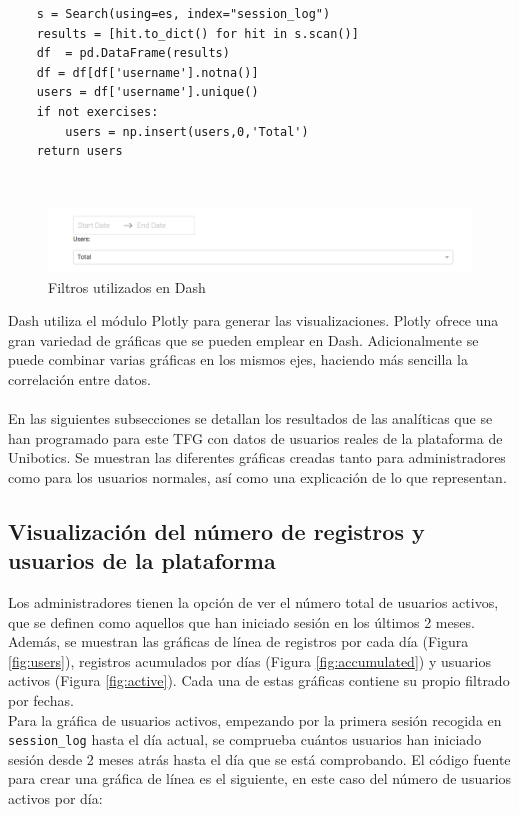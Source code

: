 \begin{lstlisting}
	s = Search(using=es, index="session_log")
    results = [hit.to_dict() for hit in s.scan()]
    df  = pd.DataFrame(results)
    df = df[df['username'].notna()]
    users = df['username'].unique()
    if not exercises:
        users = np.insert(users,0,'Total')
    return users
\end{lstlisting}
\\
\begin{figure}[H]
    \centering
    \includegraphics[width=16cm, keepaspectratio]{img/filtros.png}
    \caption{Filtros utilizados en Dash}
    \label{fig:filtros}
\end{figure}
\newpage
Dash utiliza el módulo Plotly para generar las visualizaciones. Plotly ofrece una gran variedad de gráficas que se pueden emplear en Dash. Adicionalmente se puede combinar varias gráficas en los mismos ejes, haciendo más sencilla la correlación entre datos.\\

\\
En las siguientes subsecciones se detallan los resultados de las analíticas que se han programado para este TFG con datos de usuarios reales de la plataforma de Unibotics. Se muestran las diferentes gráficas creadas tanto para administradores como para los usuarios normales, así como una explicación de lo que representan.
\subsection{Visualización del número de registros y usuarios de la plataforma}
Los administradores tienen la opción de ver el número total de usuarios activos, que se definen como aquellos que han iniciado sesión en los últimos 2 meses. Además, se muestran las gráficas de línea de registros por cada día (Figura \ref{fig:users}), registros acumulados por días (Figura \ref{fig:accumulated}) y usuarios activos (Figura \ref{fig:active}). Cada una de estas gráficas contiene su propio filtrado por fechas.\\

Para la gráfica de usuarios activos, empezando por la primera sesión recogida en \\ \texttt{session\_log} hasta el día actual, se comprueba cuántos usuarios han iniciado sesión desde 2 meses atrás hasta el día que se está comprobando. El código fuente para crear una gráfica de línea es el siguiente, en este caso del número de usuarios activos por día:

